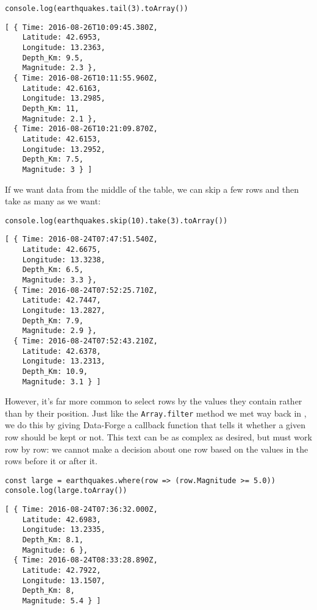 \begin{verbatim}
console.log(earthquakes.tail(3).toArray())
\end{verbatim}

\begin{verbatim}
[ { Time: 2016-08-26T10:09:45.380Z,
    Latitude: 42.6953,
    Longitude: 13.2363,
    Depth_Km: 9.5,
    Magnitude: 2.3 },
  { Time: 2016-08-26T10:11:55.960Z,
    Latitude: 42.6163,
    Longitude: 13.2985,
    Depth_Km: 11,
    Magnitude: 2.1 },
  { Time: 2016-08-26T10:21:09.870Z,
    Latitude: 42.6153,
    Longitude: 13.2952,
    Depth_Km: 7.5,
    Magnitude: 3 } ]
\end{verbatim}

If we want data from the middle of the table,
we can skip a few rows and then take as many as we want:

\begin{verbatim}
console.log(earthquakes.skip(10).take(3).toArray())
\end{verbatim}

\begin{verbatim}
[ { Time: 2016-08-24T07:47:51.540Z,
    Latitude: 42.6675,
    Longitude: 13.3238,
    Depth_Km: 6.5,
    Magnitude: 3.3 },
  { Time: 2016-08-24T07:52:25.710Z,
    Latitude: 42.7447,
    Longitude: 13.2827,
    Depth_Km: 7.9,
    Magnitude: 2.9 },
  { Time: 2016-08-24T07:52:43.210Z,
    Latitude: 42.6378,
    Longitude: 13.2313,
    Depth_Km: 10.9,
    Magnitude: 3.1 } ]
\end{verbatim}


However,
it's far more common to select rows by the values they contain rather than by their position.
Just like the \texttt{Array.filter} method we met way back in ,
we do this by giving Data-Forge a callback function that tells it whether a given row should be kept or not.
This text can be as complex as desired,
but must work row by row:
we cannot make a decision about one row based on the values in the rows before it or after it.

\begin{verbatim}
const large = earthquakes.where(row => (row.Magnitude >= 5.0))
console.log(large.toArray())
\end{verbatim}

\begin{verbatim}
[ { Time: 2016-08-24T07:36:32.000Z,
    Latitude: 42.6983,
    Longitude: 13.2335,
    Depth_Km: 8.1,
    Magnitude: 6 },
  { Time: 2016-08-24T08:33:28.890Z,
    Latitude: 42.7922,
    Longitude: 13.1507,
    Depth_Km: 8,
    Magnitude: 5.4 } ]
\end{verbatim}
    

